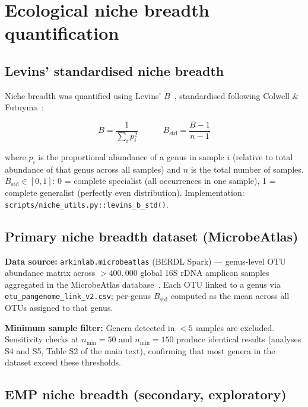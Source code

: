 \documentclass[11pt]{article}
\begin{document}
\section{Ecological niche breadth quantification}
\label{sm:niche}

\subsection{Levins' standardised niche breadth}

Niche breadth was quantified using Levins' $B$~\cite{levins1968}, standardised
following Colwell \& Futuyma~\cite{colwell1971}:

\begin{equation}
B = \frac{1}{\sum_i p_i^2} \qquad\quad
B_\mathrm{std} = \frac{B - 1}{n - 1}
\end{equation}

where $p_i$ is the proportional abundance of a genus in sample $i$ (relative
to total abundance of that genus across all samples) and $n$ is the total
number of samples.  $B_\mathrm{std} \in [0,1]$: 0 = complete specialist
(all occurrences in one sample), 1 = complete generalist (perfectly even
distribution).  Implementation: \texttt{scripts/niche\_utils.py::levins\_b\_std()}.

\subsection{Primary niche breadth dataset (MicrobeAtlas)}

\textbf{Data source:} \texttt{arkinlab.microbeatlas} (BERDL Spark) — genus-level
OTU abundance matrix across $>400{,}000$ global 16S rDNA amplicon samples
aggregated in the MicrobeAtlas database~\cite{sunagawa2015}.  Each OTU linked to a
genus via \texttt{otu\_pangenome\_link\_v2.csv}; per-genus $B_\mathrm{std}$
computed as the mean across all OTUs assigned to that genus.

\textbf{Minimum sample filter:} Genera detected in $<5$ samples are excluded.
Sensitivity checks at $n_\mathrm{min} = 50$ and $n_\mathrm{min} = 150$
produce identical results (analyses S4 and S5, Table S2 of the main text),
confirming that most genera in the dataset exceed these thresholds.

\subsection{EMP niche breadth (secondary, exploratory)}
\end{document}
